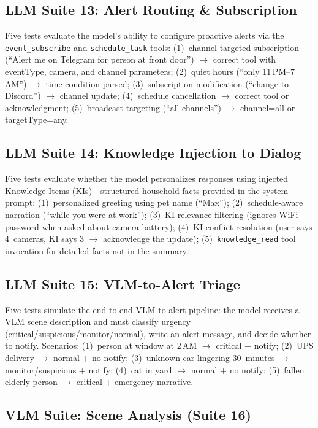 \documentclass[onecolumn,10pt]{IEEEtran}
\begin{document}
\subsection{LLM Suite 13: Alert Routing \& Subscription}

Five tests evaluate the model's ability to configure proactive alerts
via the \texttt{event\_subscribe} and \texttt{schedule\_task} tools:
(1)~channel-targeted subscription (``Alert me on Telegram for person at
front door'') $\rightarrow$ correct tool with eventType, camera, and
channel parameters; (2)~quiet hours (``only 11\,PM--7\,AM'') $\rightarrow$
time condition parsed; (3)~subscription modification (``change to
Discord'') $\rightarrow$ channel update; (4)~schedule cancellation
$\rightarrow$ correct tool or acknowledgment; (5)~broadcast targeting
(``all channels'') $\rightarrow$ channel=all or targetType=any.

\subsection{LLM Suite 14: Knowledge Injection to Dialog}

Five tests evaluate whether the model personalizes responses using
injected Knowledge Items (KIs)---structured household facts provided
in the system prompt: (1)~personalized greeting using pet name (``Max'');
(2)~schedule-aware narration (``while you were at work'');
(3)~KI relevance filtering (ignores WiFi password when asked about camera
battery); (4)~KI conflict resolution (user says 4~cameras, KI says 3
$\rightarrow$ acknowledge the update); (5)~\texttt{knowledge\_read} tool
invocation for detailed facts not in the summary.

\subsection{LLM Suite 15: VLM-to-Alert Triage}

Five tests simulate the end-to-end VLM-to-alert pipeline: the model
receives a VLM scene description and must classify urgency
(critical/suspicious/monitor/normal), write an alert message, and
decide whether to notify. Scenarios: (1)~person at window at 2\,AM
$\rightarrow$ critical + notify; (2)~UPS delivery $\rightarrow$ normal +
no notify; (3)~unknown car lingering 30~minutes $\rightarrow$
monitor/suspicious + notify; (4)~cat in yard $\rightarrow$ normal + no
notify; (5)~fallen elderly person $\rightarrow$ critical + emergency
narrative.

\subsection{VLM Suite: Scene Analysis (Suite 16)}
\end{document}
